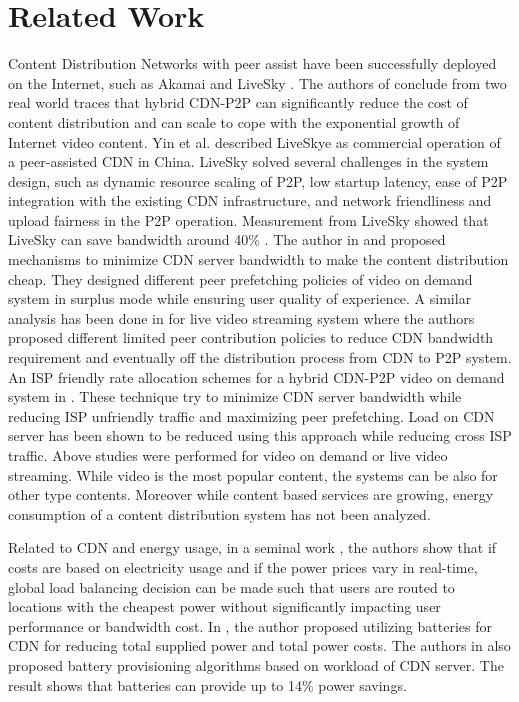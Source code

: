 \documentclass[JIP]{ipsj}
\begin{document}
\section{Related Work} 

Content Distribution Networks with peer assist have been successfully deployed on the Internet, such as Akamai \cite{Huang:2008:UHC:1496046.1496064} and LiveSky \cite{Yin:2010:LEC:1823746.1823750}.  
The authors of \cite{Huang:2008:UHC:1496046.1496064} conclude from two real world traces that hybrid CDN-P2P can significantly reduce the cost of content distribution and can scale to cope with the exponential growth of Internet video content.  
Yin et al. \cite{Yin:2010:LEC:1823746.1823750} described LiveSkye as commercial operation of a peer-assisted CDN in China.  
LiveSky solved several challenges in the system design, such as dynamic resource scaling of P2P, low startup latency, ease of P2P integration with the existing CDN infrastructure, and network friendliness and upload fairness in the P2P operation.  
Measurement from LiveSky showed that LiveSky can save bandwidth around 40\% \cite{Yin:2010:LEC:1823746.1823750}.
The author in \cite{Huang:2007:IVP:1282427.1282396} and \cite{huang2007peer} proposed mechanisms to minimize CDN server bandwidth to make the content distribution cheap.
They designed different peer prefetching policies of video on demand system in surplus mode while ensuring user quality of experience.
A similar analysis has been done in \cite{xu2006analysis} for live video streaming system where the authors proposed different limited peer contribution policies to reduce CDN bandwidth requirement and eventually off the distribution process from CDN to P2P system. 
An ISP friendly rate allocation schemes for a hybrid CDN-P2P video on demand system in \cite{Wang:2008:IRA:1459359.1459397}. 
These technique try to minimize CDN server bandwidth while reducing ISP unfriendly traffic and maximizing peer prefetching.
Load on CDN server has been shown to be reduced using this approach while reducing cross ISP traffic.
Above studies were performed for video on demand or live video streaming.
While video is the most popular content, the systems can be also for other type contents.
Moreover while content based services are growing, energy consumption of a content distribution system has not been analyzed.

Related to CDN and energy usage, in a seminal work \cite{qureshi2009cutting}, the authors show that if costs are based on electricity usage and if the power prices vary in real-time, global load balancing decision can be made such that users are routed to locations with the cheapest power without significantly impacting user performance or bandwidth cost.  
In \cite{Palasamudram:2012:UBR:2391229.2391240}, the author proposed utilizing batteries for CDN for reducing total supplied power and total power costs.
The authors in \cite{Palasamudram:2012:UBR:2391229.2391240} also proposed battery provisioning algorithms based on workload of CDN server. 
The result shows that batteries can provide up to 14\% power savings.
\end{document}
